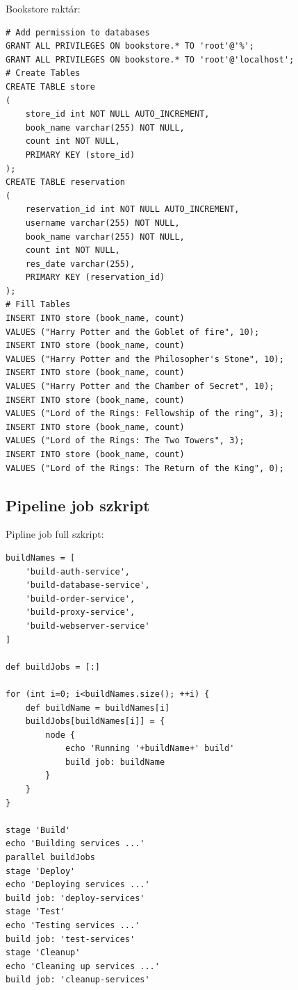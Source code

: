 \documentclass[11pt,magyar,a4paper,twoside,]{report}
\begin{document}
Bookstore raktár:

\begin{verbatim}
# Add permission to databases
GRANT ALL PRIVILEGES ON bookstore.* TO 'root'@'%';
GRANT ALL PRIVILEGES ON bookstore.* TO 'root'@'localhost';
# Create Tables
CREATE TABLE store
(
    store_id int NOT NULL AUTO_INCREMENT,
    book_name varchar(255) NOT NULL,
    count int NOT NULL,
    PRIMARY KEY (store_id)
);
CREATE TABLE reservation
(
    reservation_id int NOT NULL AUTO_INCREMENT,
    username varchar(255) NOT NULL,
    book_name varchar(255) NOT NULL,
    count int NOT NULL,
    res_date varchar(255),
    PRIMARY KEY (reservation_id)
);
# Fill Tables
INSERT INTO store (book_name, count)
VALUES ("Harry Potter and the Goblet of fire", 10);
INSERT INTO store (book_name, count)
VALUES ("Harry Potter and the Philosopher's Stone", 10);
INSERT INTO store (book_name, count)
VALUES ("Harry Potter and the Chamber of Secret", 10);
INSERT INTO store (book_name, count)
VALUES ("Lord of the Rings: Fellowship of the ring", 3);
INSERT INTO store (book_name, count)
VALUES ("Lord of the Rings: The Two Towers", 3);
INSERT INTO store (book_name, count)
VALUES ("Lord of the Rings: The Return of the King", 0);
\end{verbatim}

\subsection{\texorpdfstring{Pipeline job
szkript\label{appendix-pipline}}{Pipeline job szkript}}\label{pipeline-job-szkript}

Pipline job full szkript:

\begin{verbatim}
buildNames = [
    'build-auth-service',
    'build-database-service',
    'build-order-service',
    'build-proxy-service',
    'build-webserver-service'
]

def buildJobs = [:]

for (int i=0; i<buildNames.size(); ++i) {
    def buildName = buildNames[i]
    buildJobs[buildNames[i]] = {
        node {
            echo 'Running '+buildName+' build'
            build job: buildName
        }
    }
}

stage 'Build'
echo 'Building services ...'
parallel buildJobs
stage 'Deploy'
echo 'Deploying services ...'
build job: 'deploy-services'
stage 'Test'
echo 'Testing services ...'
build job: 'test-services'
stage 'Cleanup'
echo 'Cleaning up services ...'
build job: 'cleanup-services'
\end{verbatim}
\end{document}
